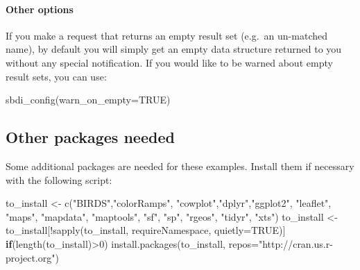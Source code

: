 \documentclass[
  10pt,
]{article}
\newenvironment{Shaded}{\begin{snugshade}}{\end{snugshade}}
\newcommand{\AttributeTok}[1]{\textcolor[rgb]{0.77,0.63,0.00}{#1}}
\newcommand{\ConstantTok}[1]{\textcolor[rgb]{0.00,0.00,0.00}{#1}}
\newcommand{\ControlFlowTok}[1]{\textcolor[rgb]{0.13,0.29,0.53}{\textbf{#1}}}
\newcommand{\DecValTok}[1]{\textcolor[rgb]{0.00,0.00,0.81}{#1}}
\newcommand{\FunctionTok}[1]{\textcolor[rgb]{0.00,0.00,0.00}{#1}}
\newcommand{\NormalTok}[1]{#1}
\newcommand{\OtherTok}[1]{\textcolor[rgb]{0.56,0.35,0.01}{#1}}
\newcommand{\SpecialCharTok}[1]{\textcolor[rgb]{0.00,0.00,0.00}{#1}}
\newcommand{\StringTok}[1]{\textcolor[rgb]{0.31,0.60,0.02}{#1}}
\begin{document}
\hypertarget{other-options}{%
\paragraph*{Other options}\label{other-options}}

If you make a request that returns an empty result set (e.g.~an un-matched name), by default you will simply get an empty data structure returned to you without any special notification. If you would like to be warned about empty result sets, you can use:

\begin{Shaded}
\begin{Highlighting}[]
\FunctionTok{sbdi\_config}\NormalTok{(}\AttributeTok{warn\_on\_empty=}\ConstantTok{TRUE}\NormalTok{)}
\end{Highlighting}
\end{Shaded}

\hypertarget{other-packages-needed}{%
\subsection*{Other packages needed}\label{other-packages-needed}}

Some additional packages are needed for these examples. Install them if necessary with the following script:

\begin{Shaded}
\begin{Highlighting}[]
\NormalTok{to\_install }\OtherTok{\textless{}{-}} \FunctionTok{c}\NormalTok{(}\StringTok{"BIRDS"}\NormalTok{,}\StringTok{"colorRamps"}\NormalTok{, }\StringTok{"cowplot"}\NormalTok{,}\StringTok{"dplyr"}\NormalTok{,}\StringTok{"ggplot2"}\NormalTok{, }
                \StringTok{"leaflet"}\NormalTok{, }\StringTok{"maps"}\NormalTok{, }\StringTok{"mapdata"}\NormalTok{, }\StringTok{"maptools"}\NormalTok{, }\StringTok{"sf"}\NormalTok{, }\StringTok{"sp"}\NormalTok{,}
                \StringTok{"rgeos"}\NormalTok{, }\StringTok{"tidyr"}\NormalTok{, }\StringTok{"xts"}\NormalTok{)}
\NormalTok{to\_install }\OtherTok{\textless{}{-}}\NormalTok{ to\_install[}\SpecialCharTok{!}\FunctionTok{sapply}\NormalTok{(to\_install, }
\NormalTok{                                 requireNamespace, }
                                 \AttributeTok{quietly=}\ConstantTok{TRUE}\NormalTok{)]}
\ControlFlowTok{if}\NormalTok{(}\FunctionTok{length}\NormalTok{(to\_install)}\SpecialCharTok{\textgreater{}}\DecValTok{0}\NormalTok{)}
    \FunctionTok{install.packages}\NormalTok{(to\_install, }
                     \AttributeTok{repos=}\StringTok{"http://cran.us.r{-}project.org"}\NormalTok{)}
\end{Highlighting}
\end{Shaded}
\end{document}
